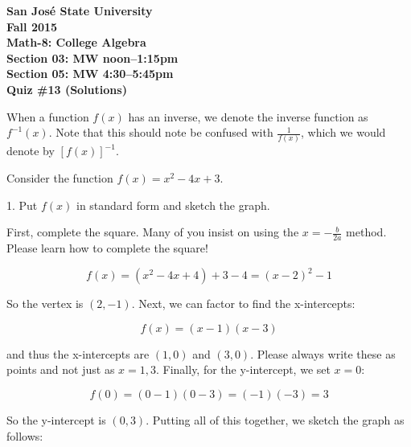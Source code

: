 \documentclass[letterpaper, 12pt]{article}
\begin{document}
\begin{center}
\bfseries
San Jos\'{e} State University \\
Fall 2015 \\
Math-8: College Algebra \\
Section 03: MW noon--1:15pm \\
Section 05: MW 4:30--5:45pm \\
\bigskip
Quiz \#13 (Solutions)
\end{center}

\bigskip

When a function $f(x)$ has an inverse, we denote the inverse function as
$f^{-1}(x)$. Note that this should note be confused with $\frac{1}{f(x)}$,
which we would denote by $[f(x)]^{-1}$.

\bigskip

Consider the function $f(x)=x^2-4x+3$.

\bigskip

1. Put $f(x)$ in standard form and sketch the graph.

First, complete the square.  Many of you insist on using the $x=-\frac{b}{2a}$
method.  Please learn how to complete the square!

\[f(x) = (x^2-4x+4)+3-4 = (x-2)^2-1\]

So the vertex is $(2, -1)$.  Next, we can factor to find the x-intercepts:

\[f(x)=(x-1)(x-3)\]

and thus the x-intercepts are $(1,0)$ and $(3,0)$.  Please always write these
as points and not just as $x=1,3$.  Finally, for the y-intercept, we set $x=0$:

\[f(0)=(0-1)(0-3)=(-1)(-3)=3\]

So the y-intercept is $(0,3)$.  Putting all of this together, we sketch the
graph as follows:

\bigskip

\begin{center}
\end{center}

\bigskip
\end{document}
